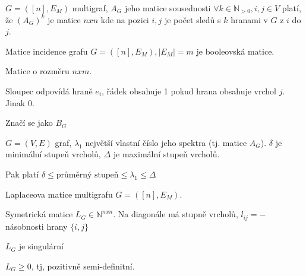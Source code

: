 \documentclass[../main.tex]{subfiles}
\begin{document}
\begin{claim}
    $G=([n], E_M)$ multigraf, $A_G$ jeho matice sousednosti 
    $\forall k \in \mathbb{N}_{>0}, i,j\in V$ platí, že $(A_G)^k$ 
    je matice $nxn$ kde na pozici $i,j$ je počet sledů s $k$ hranami 
    v $G$ z $i$ do $j$.
\end{claim}


\begin{definition}
    Matice incidence grafu $G=([n], E_M), |E_M| = m$ je booleovská matice.

    Matice  o rozměru $nxm$.

    Sloupec odpovídá hraně $e_i$, řádek obsahuje 1 pokud hrana obsahuje vrchol $j$. Jinak 0.

    Značí se jako $B_G$
\end{definition}


\begin{claim}
    $G=(V,E)$ graf, $\lambda_1$ největší vlastní číslo jeho spektra (tj. matice $A_G$). $\delta$ je minimální stupeň vrcholů, $\Delta$ je maximální stupeň vrcholů.

    Pak platí $\delta \leq \text{průměrný stupeň} \leq \lambda_1 \leq \Delta$
\end{claim}


\begin{definition}
    Laplaceova matice multigrafu $G=([n], E_M)$.

    Symetrická matice $L_G\in \mathbb{N}^{nxn}$. Na diagonále má stupně vrcholů, $l_{ij} = -$ násobnosti hrany $\{i,j\}$
\end{definition}

\begin{claim}
    $L_G$ je singulární
\end{claim}

\begin{claim}
    $L_G\geq 0$, tj, pozitivně semi-definitní.
\end{claim}
\end{document}
